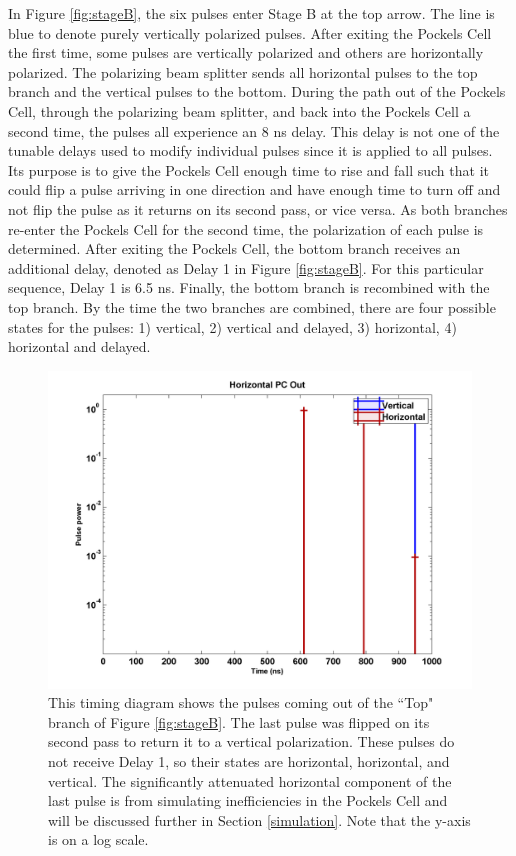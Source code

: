 \documentclass[pdftex,12pt,a4paper]{article}
\begin{document}
In Figure \ref{fig:stageB}, the six pulses enter Stage B at the top arrow. The line is blue to denote purely vertically polarized pulses. After exiting the Pockels Cell the first time, some pulses are vertically polarized and others are horizontally polarized. The polarizing beam splitter sends all horizontal pulses to the top branch and the vertical pulses to the bottom. During the path out of the Pockels Cell, through the polarizing beam splitter, and back into the Pockels Cell a second time, the pulses all experience an 8 ns delay. This delay is not one of the tunable delays used to modify individual pulses since it is applied to all pulses. Its purpose is to give the Pockels Cell enough time to rise and fall such that it could flip a pulse arriving in one direction and have enough time to turn off and not flip the pulse as it returns on its second pass, or vice versa. As both branches re-enter the Pockels Cell for the second time, the polarization of each pulse is determined. After exiting the Pockels Cell, the bottom branch receives an additional delay, denoted as Delay 1 in Figure \ref{fig:stageB}. For this particular sequence, Delay 1 is 6.5 ns. Finally, the bottom branch is recombined with the top branch. By the time the two branches are combined, there are four possible states for the pulses: 1) vertical, 2) vertical and delayed, 3) horizontal, 4) horizontal and delayed. 


\begin{figure}[H]
\centering
\includegraphics[scale=0.6]{horizPCOut.png} \caption{This timing diagram shows the pulses coming out of the ``Top" branch of Figure \ref{fig:stageB}. The last pulse was flipped on its second pass to return it to a vertical polarization. These pulses do not receive Delay 1, so their states are horizontal, horizontal, and vertical. The significantly attenuated horizontal component of the last pulse is from simulating inefficiencies in the Pockels Cell and will be discussed further in Section \ref{simulation}. Note that the y-axis is on a log scale.}
\label{fig:timing_B1}
\end{figure}
\end{document}
